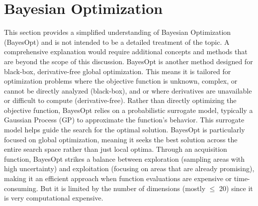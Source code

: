 \section{Bayesian Optimization}
This section provides a simplified understanding of Bayesian Optimization (BayesOpt) and is not intended to be a detailed 
treatment of the topic. A comprehensive explanation would require additional concepts and methods that are beyond the scope of 
this discussion.\newline 
BayesOpt is another method designed for black-box, derivative-free global 
optimization. This means it is tailored for optimization problems where the objective 
function is unknown, complex, or cannot be directly analyzed (black-box), and or where 
derivatives are unavailable or difficult to compute (derivative-free).\newline 
Rather than directly optimizing the objective function, BayesOpt relies on a probabilistic surrogate model, typically a 
Gaussian Process (GP) to approximate the function's behavior. This surrogate model helps guide the search for the optimal 
solution. BayesOpt is particularly focused on global optimization, meaning it seeks the best solution across the entire search 
space rather than just local optima.\newline 
Through an acquisition function, BayesOpt strikes a balance between exploration (sampling areas with high uncertainty) and exploitation (focusing on areas that are already promising), making it an efficient approach when function evaluations are expensive or time-consuming. But it is limited by the number of dimensions (mostly $\leq$ 20) since it is 
very computational expensive. 


